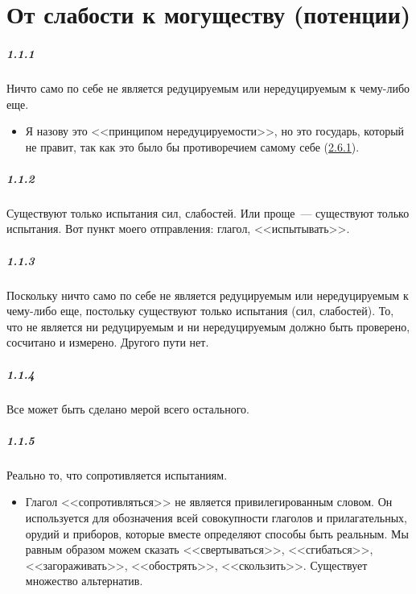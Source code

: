 \chapter{От слабости к могуществу (потенции)}\hypertarget{chap1}{}

\paragraph{1.1.1}\hypertarget{par:1.1.1}{} Ничто само по себе не является редуцируемым или нередуцируемым к чему-либо еще. 
	\begin{itemize}
	\item {Я назову это <<принципом нередуцируемости>>, но это государь, который не правит, так как это было бы противоречием самому себе (\hyperlink{par:2.6.1}{2.6.1})}.
	\end{itemize}

\paragraph{1.1.2}\hypertarget{par:1.1.2}{} Существуют только испытания сил, слабостей. Или проще~--- существуют только испытания. Вот пункт моего отправления: глагол, <<испытывать>>.

\paragraph{1.1.3}\hypertarget{par:1.1.3}{} Поскольку ничто само по себе не является редуцируемым или нередуцируемым к чему-либо еще, постольку существуют только испытания (сил, слабостей). То, что не является ни редуцируемым и ни нередуцируемым должно быть проверено, сосчитано и измерено. Другого пути нет.

\paragraph{1.1.4}\hypertarget{par:1.1.4}{} Все может быть сделано мерой всего остального.

\paragraph{1.1.5}\hypertarget{par:1.1.5}{} Реально то, что сопротивляется испытаниям.
	\begin{itemize}
	\item Глагол <<сопротивляться>> не является привилегированным словом. Он используется для обозначения всей совокупности глаголов и прилагательных, орудий и приборов, которые вместе определяют способы быть реальным. Мы равным образом можем сказать <<свертываться>>, <<сгибаться>>, <<загораживать>>, <<обострять>>, <<скользить>>. Существует множество альтернатив.
	\end{itemize}

